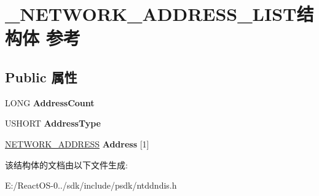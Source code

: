 \hypertarget{struct___n_e_t_w_o_r_k___a_d_d_r_e_s_s___l_i_s_t}{}\section{\+\_\+\+N\+E\+T\+W\+O\+R\+K\+\_\+\+A\+D\+D\+R\+E\+S\+S\+\_\+\+L\+I\+S\+T结构体 参考}
\label{struct___n_e_t_w_o_r_k___a_d_d_r_e_s_s___l_i_s_t}
\subsection*{Public 属性}
\begin{DoxyCompactItemize}
\item 
\mbox{\label{struct___n_e_t_w_o_r_k___a_d_d_r_e_s_s___l_i_s_t_a4db2b2e2f3951c370ba58493bd4e1873}} 
L\+O\+NG {\bfseries Address\+Count}
\item 
\mbox{\label{struct___n_e_t_w_o_r_k___a_d_d_r_e_s_s___l_i_s_t_a8cb05c14e01b64c10d5d27b175aa83e7}} 
U\+S\+H\+O\+RT {\bfseries Address\+Type}
\item 
\mbox{\label{struct___n_e_t_w_o_r_k___a_d_d_r_e_s_s___l_i_s_t_a71397ba0f004129a4dc6a08caea46ddf}} 
\hyperlink{struct___n_e_t_w_o_r_k___a_d_d_r_e_s_s}{N\+E\+T\+W\+O\+R\+K\+\_\+\+A\+D\+D\+R\+E\+SS} {\bfseries Address} \mbox{[}1\mbox{]}
\end{DoxyCompactItemize}


该结构体的文档由以下文件生成\+:\begin{DoxyCompactItemize}
\item 
E\+:/\+React\+O\+S-\/0../sdk/include/psdk/ntddndis.\+h\end{DoxyCompactItemize}
